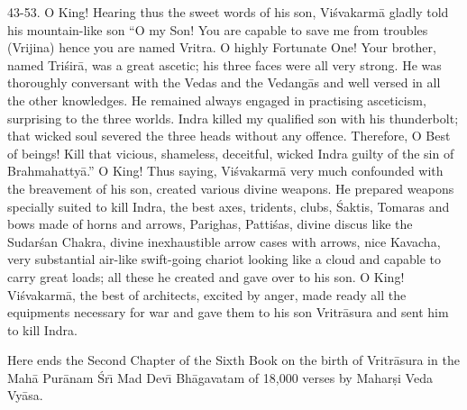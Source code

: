 43-53. O King! Hearing thus the sweet words of his son, Vi\'svakarm\=a gladly told his mountain-like son ``O my Son! You are capable to save me from troubles (Vrijina) hence you are named Vritra. O highly Fortunate One! Your brother, named Tri\'sir\=a, was a great ascetic; his three faces were all very strong. He was thoroughly conversant with the Vedas and the Vedang\=as and well versed in all the other knowledges. He remained always engaged in practising asceticism, surprising to the three worlds. Indra killed my qualified son with his thunderbolt; that wicked soul severed the three heads without any offence. Therefore, O Best of beings! Kill that vicious, shameless, deceitful, wicked Indra guilty of the sin of Brahmahatty\=a.'' O King! Thus saying, Vi\'svakarm\=a very much confounded with the breavement of his son, created various divine weapons. He prepared weapons specially suited to kill Indra, the best axes, tridents, clubs, \'Saktis, Tomaras and bows made of horns and arrows, Parighas, Patti\'sas, divine discus like the Sudar\'san Chakra, divine inexhaustible arrow cases with arrows, nice Kavacha, very substantial air-like swift-going chariot looking like a cloud and capable to carry great loads; all these he created and gave over to his son. O King! Vi\'svakarm\=a, the best of architects, excited by anger, made ready all the equipments necessary for war and gave them to his son Vritr\=asura and sent him to kill Indra.

Here ends the Second Chapter of the Sixth Book on the birth of Vritr\=asura in the Mah\=a Pur\=anam \'Sr\={\i} Mad Dev\={\i} Bh\=agavatam of 18,000 verses by Mahar\d{s}i Veda Vy\=asa.



